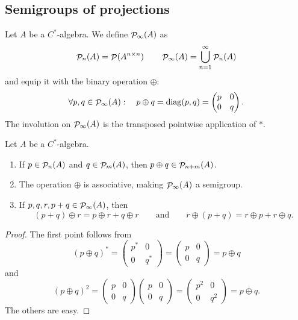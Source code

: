 \subsection{Semigroups of projections}
\begin{definition}
Let $A$ be a $C^*$-algebra. We define $\mathop{\mathcal{P}}\nolimits_\infty(A)$ as
\[ \mathop{\mathcal{P}}\nolimits_n(A) = \mathop{\mathcal{P}}\nolimits(A^{n\times n}) \qquad \mathop{\mathcal{P}}\nolimits_\infty(A) = \bigcup_{n=1}^\infty \mathop{\mathcal{P}}\nolimits_n(A) \]
and equip it with the binary operation $\oplus$:
\[ \forall p,q\in \mathop{\mathcal{P}}\nolimits_\infty(A): \quad p\oplus q = \operatorname{diag}(p,q) = \begin{pmatrix}
p & 0 \\ 0 & q
\end{pmatrix}. \]
The involution on $\mathop{\mathcal{P}}\nolimits_\infty(A)$ is the transposed pointwise application of $*$.
\end{definition}

\begin{lemma}
Let $A$ be a $C^*$-algebra.
\begin{enumerate}
\item If $p\in\mathop{\mathcal{P}}\nolimits_n(A)$ and $q\in\mathop{\mathcal{P}}\nolimits_m(A)$, then $p\oplus q\in\mathop{\mathcal{P}}\nolimits_{n+m}(A)$.
\item The operation $\oplus$ is associative, making $\mathop{\mathcal{P}}\nolimits_\infty(A)$ a semigroup.
\item If $p,q,r, p+q\in\mathop{\mathcal{P}}\nolimits_\infty(A)$, then
\[ (p+q)\oplus r = p\oplus r + q\oplus r \qquad \text{and} \qquad r\oplus(p+q) = r\oplus p +r\oplus q. \]
\end{enumerate}
\end{lemma}
\begin{proof}
The first point follows from
\[ (p\oplus q)^* = \begin{pmatrix}
p^* & 0 \\ 0 & q^*
\end{pmatrix} = \begin{pmatrix}
p & 0 \\ 0 & q
\end{pmatrix} = p\oplus q \]
and
\[ (p\oplus q)^2 = \begin{pmatrix}
p & 0 \\ 0 & q
\end{pmatrix}\begin{pmatrix}
p & 0 \\ 0 & q
\end{pmatrix} = \begin{pmatrix}
p^2 & 0 \\ 0 & q^2
\end{pmatrix} = p\oplus q. \]
The others are easy.
\end{proof}


